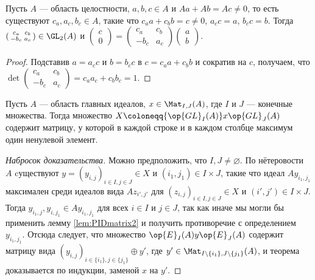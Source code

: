 \documentclass[
	extrafontsizes,
	11pt,
	hyphens,
]{memoir}
\begin{document}
\begin{lemma}
Пусть \(A\) --- область целостности, \(a,b,c \in A\) и \(Aa + Ab = Ac \neq 0\), то есть существуют \(c_a,a_c,b_c \in A\), такие что \(c_a a + c_b b = c \neq 0\), \(a_c c = a\), \(b_c c = b\).
\label{lem:PIDmatrix2}
Тогда
\(
(
\begin{smallmatrix}
    c_a & c_b \\
    -b_c & a_c
\end{smallmatrix}
)
\in
\GL_2(A)
\)
и
\(
(
\begin{smallmatrix}
    c \\
    0 
\end{smallmatrix}
)
=
(
\begin{smallmatrix}
    c_a & c_b \\
    -b_c & a_c
\end{smallmatrix}
)
(
\begin{smallmatrix}
    a \\
    b 
\end{smallmatrix}
)
\).
\end{lemma}

\begin{proof}
Подставив \(a = a_c c\) и \(b = b_c c\) в \(c = c_a a + c_b b\) и сократив на \(c\), получаем, что
\(
\det
(
\begin{smallmatrix}
    c_a & c_b \\
    -b_c & a_c
\end{smallmatrix}
)
= c_a a_c + c_b b_c
= 1
\).
\end{proof}

\begin{theorem}
\label{thm:diagpid}
Пусть \(A\) --- область главных идеалов,
\(x \in \Mat_{I,J}(A)\), где \(I\) и \(J\) --- конечные множества. Тогда множество
\(X \coloneqq {\op{GL}_I(A)} x {\op{GL}_J(A)}\)
содержит матрицу, у которой в каждой строке и в каждом столбце максимум один ненулевой элемент.
\end{theorem}

\begin{proof}[Набросок доказательства]
Можно предположить, что \(I,J \neq \varnothing\).
По нётеровости \(A\) cуществуют \(y = (y_{i,j})_{i \in I, j \in J} \in X\) и \((i_1,j_1) \in I \times J\), такие что идеал \(Ay_{i_1,j_1}\) максимален среди идеалов вида \(Az_{i',j'}\) для \((z_{i,j})_{i \in I, j \in J} \in X\) и \((i',j') \in I \times J\).
Тогда \(y_{i_1,j}, y_{i,j_1} \in A y_{i_1,j_1}\) для всех \(i \in I\) и \(j \in J\), так как иначе мы могли бы применить лемму \ref{lem:PIDmatrix2} и получить противоречие с определением \(y_{i_1,j_1}\).
Отсюда следует, что множество \(\op{E}_I(A)y\op{E}_J(A)\)
содержит матрицу вида \((y_{i,j})_{i \in \{i_1\}, j \in \{j_1\}} \oplus y'\), где \(y' \in \Mat_{I \setminus \{i_1\},J \setminus \{j_1\}}(A)\), и
теорема доказывается по индукции, заменой \(x\) на \(y'\).
\end{proof}
\end{document}
